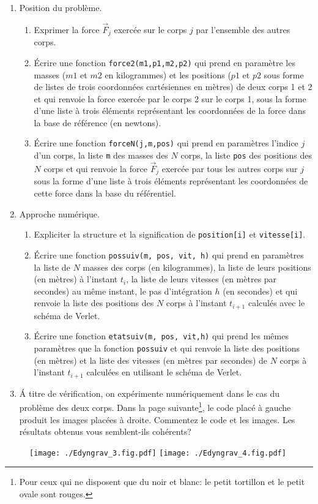 \begin{enumerate}
  \item Position du problème.
\begin{enumerate}
  \item Exprimer la force $\overrightarrow{F}_j$ exercée sur le corps $j$ par l'ensemble des autres corps.
  \item \'Ecrire une fonction \texttt{force2(m1,p1,m2,p2)} qui prend en paramètre les masses ($m1$ et $m2$ en kilogrammes) et les positions ($p1$ et $p2$ sous forme de listes de trois coordonnées cartésiennes en mètres) de deux corps 1 et 2 et qui renvoie la force exercée par le corps 2 sur le corps 1, sous la forme d'une liste à trois éléments représentant les coordonnées de la force dans la base de référence (en newtons).
  \item \'Ecrire une fonction \texttt{forceN(j,m,pos)} qui prend en paramètres l'indice $j$ d'un corps, la liste \texttt{m} des masses des $N$ corps, la liste \texttt{pos} des positions des $N$ corps et qui renvoie la force $\overrightarrow{F}_j$ exercée par tous les autres corps sur $j$ sous la forme d'une liste à trois éléments représentant les coordonnées de cette force dans la base du référentiel.
\end{enumerate}

\item Approche numérique.
\begin{enumerate}
  \item Expliciter la structure et la signification de \texttt{position[i]} et \texttt{vitesse[i]}.
  \item \'Ecrire une fonction \texttt{pos\textunderscore suiv(m, pos, vit, h)} qui prend en paramètres la liste de $N$ masses des corps (en kilogrammes), la liste de leurs positions (en mètres) à l'instant $t_i$, la liste de leurs vitesses (en mètres par secondes) au même instant, le pas d'intégration $h$ (en secondes) et qui renvoie la liste des positions des $N$ corps à l'instant $t_{i+1}$ calculés avec le schéma de Verlet.
  \item \'Ecrire une fonction \texttt{etat\textunderscore suiv(m, pos, vit,h)} qui prend les mêmes paramètres que la fonction \texttt{pos\textunderscore suiv} et qui renvoie la liste des positions (en mètres) et la liste des vitesses (en mètres par secondes) de $N$ corps à l'instant $t_{i+1}$ calculées en utilisant le schéma de Verlet. 
\end{enumerate}
  \item \'A titre de vérification, on expérimente numériquement dans le cas du problème des deux corps. Dans la page suivante\footnote{Pour ceux qui ne disposent que du noir et blanc: le petit tortillon et le petit ovale sont rouges.}, le code placé à gauche produit les images placées à droite. Commentez le code et les images. Les résultats obtenus vous semblent-ils cohérents?
\end{enumerate}
\newpage

\begin{figure}[h]
  \centering
  \texttt{[image: ./Edyngrav\_3.fig.pdf]}
  \texttt{[image: ./Edyngrav\_4.fig.pdf]}
\end{figure}




